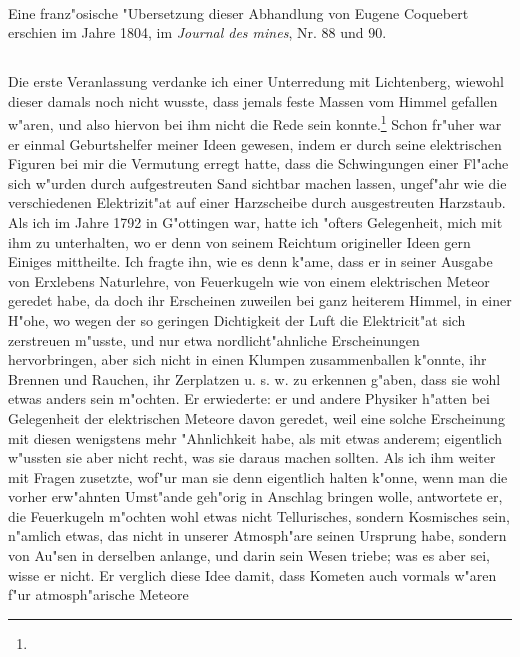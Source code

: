 \documentclass[a4paper, 11pt, oneside, polutonikogreek, german]{article}
\begin{document}
\paragraph{}
Eine franz"osische "Ubersetzung dieser Abhandlung von Eugene Coquebert erschien im Jahre 1804, im \emph{Journal des mines}, Nr. 88 und 90.
\subsection{}
\paragraph{}
Die erste Veranlassung verdanke ich einer Unterredung mit Lichtenberg, wiewohl dieser damals noch nicht wusste, dass jemals feste Massen vom Himmel gefallen w"aren, und also hiervon bei ihm nicht die Rede sein konnte.\footnote{} Schon fr"uher war er einmal Geburtshelfer meiner Ideen gewesen, indem er durch seine elektrischen Figuren bei mir die Vermutung erregt hatte, dass die Schwingungen einer Fl"ache sich w"urden durch aufgestreuten Sand sichtbar machen lassen, ungef"ahr wie die verschiedenen Elektrizit"at auf einer Harzscheibe durch ausgestreuten Harzstaub. Als ich im Jahre 1792 in G"ottingen war, hatte ich "ofters Gelegenheit, mich mit ihm zu unterhalten, wo er denn von seinem Reichtum origineller Ideen gern Einiges mittheilte. Ich fragte ihn, wie es denn k"ame, dass er in seiner Ausgabe von Erxlebens Naturlehre, von Feuerkugeln wie von einem elektrischen Meteor geredet habe, da doch ihr Erscheinen zuweilen bei ganz heiterem Himmel, in einer H"ohe, wo wegen der so geringen Dichtigkeit der Luft die Elektricit"at sich zerstreuen m"usste, und nur etwa nordlicht"ahnliche Erscheinungen hervorbringen, aber sich nicht in einen Klumpen zusammenballen k"onnte, ihr Brennen und Rauchen, ihr Zerplatzen u. s. w. zu erkennen g"aben, dass sie wohl etwas anders sein m"ochten. Er erwiederte: er und andere Physiker h"atten bei Gelegenheit der elektrischen Meteore davon geredet, weil eine solche Erscheinung mit diesen wenigstens mehr "Ahnlichkeit habe, als mit etwas anderem; eigentlich w"ussten sie aber nicht recht, was sie daraus machen sollten. Als ich ihm weiter mit Fragen zusetzte, wof"ur man sie denn eigentlich halten k"onne, wenn man die vorher erw"ahnten Umst"ande geh"orig in Anschlag bringen wolle, antwortete er, die Feuerkugeln m"ochten wohl etwas nicht Tellurisches, sondern Kosmisches sein, n"amlich etwas, das nicht in unserer Atmosph"are seinen Ursprung habe, sondern von Au"sen in derselben anlange, und darin sein Wesen triebe; was es aber sei, wisse er nicht. Er verglich diese Idee damit, dass Kometen auch vormals w"aren f"ur atmosph"arische Meteore 
\end{document}
